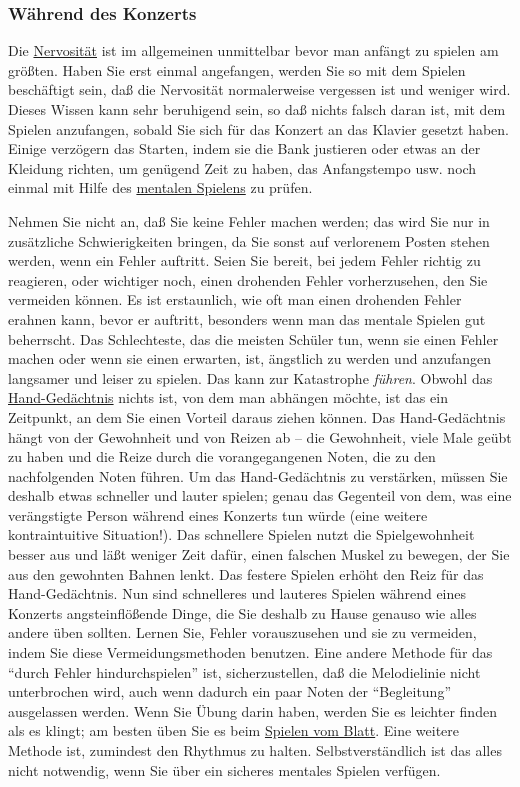 
\subsubsection{Während des Konzerts}
\label{c1iii14g}

Die \hyperref[c1iii15]{Nervosität} ist im allgemeinen unmittelbar bevor man anfängt zu spielen am größten.
Haben Sie erst einmal angefangen, werden Sie so mit dem Spielen beschäftigt sein, daß die Nervosität normalerweise vergessen ist und weniger wird.
Dieses Wissen kann sehr beruhigend sein, so daß nichts falsch daran ist, mit dem Spielen anzufangen, sobald Sie sich für das Konzert an das Klavier gesetzt haben.
Einige verzögern das Starten, indem sie die Bank justieren oder etwas an der Kleidung richten, um genügend Zeit zu haben, das Anfangstempo usw. noch einmal mit Hilfe des \hyperref[c1ii12mental]{mentalen Spielens} zu prüfen.

Nehmen Sie nicht an, daß Sie keine Fehler machen werden; das wird Sie nur in zusätzliche Schwierigkeiten bringen, da Sie sonst auf verlorenem Posten stehen werden, wenn ein Fehler auftritt.
Seien Sie bereit, bei jedem Fehler richtig zu reagieren, oder wichtiger noch, einen drohenden Fehler vorherzusehen, den Sie vermeiden können.
Es ist erstaunlich, wie oft man einen drohenden Fehler erahnen kann, bevor er auftritt, besonders wenn man das mentale Spielen gut beherrscht.
Das Schlechteste, das die meisten Schüler tun, wenn sie einen Fehler machen oder wenn sie einen erwarten, ist, ängstlich zu werden und anzufangen langsamer und leiser zu spielen.
Das kann zur Katastrophe \textit{führen}.
Obwohl das \hyperref[c1iii6d]{Hand-Gedächtnis} nichts ist, von dem man abhängen möchte, ist das ein Zeitpunkt, an dem Sie einen Vorteil daraus ziehen können.
Das Hand-Gedächtnis hängt von der Gewohnheit und von Reizen ab -- die Gewohnheit, viele Male geübt zu haben und die Reize durch die vorangegangenen Noten, die zu den nachfolgenden Noten führen.
Um das Hand-Gedächtnis zu verstärken, müssen Sie deshalb etwas schneller und lauter spielen; genau das Gegenteil von dem, was eine verängstigte Person während eines Konzerts tun würde (eine weitere kontraintuitive Situation!).
Das schnellere Spielen nutzt die Spielgewohnheit besser aus und läßt weniger Zeit dafür, einen falschen Muskel zu bewegen, der Sie aus den gewohnten Bahnen lenkt.
Das festere Spielen erhöht den Reiz für das Hand-Gedächtnis.
Nun sind schnelleres und lauteres Spielen während eines Konzerts angsteinflößende Dinge, die Sie deshalb zu Hause genauso wie alles andere üben sollten.
Lernen Sie, Fehler vorauszusehen und sie zu vermeiden, indem Sie diese Vermeidungsmethoden benutzen.
Eine andere Methode für das \enquote{durch Fehler hindurchspielen} ist, sicherzustellen, daß die Melodielinie nicht unterbrochen wird, auch wenn dadurch ein paar Noten der \enquote{Begleitung} ausgelassen werden.
Wenn Sie Übung darin haben, werden Sie es leichter finden als es klingt; am besten üben Sie es beim \hyperref[c1iii11]{Spielen vom Blatt}.
Eine weitere Methode ist, zumindest den Rhythmus zu halten.
Selbstverständlich ist das alles nicht notwendig, wenn Sie über ein sicheres mentales Spielen verfügen.

